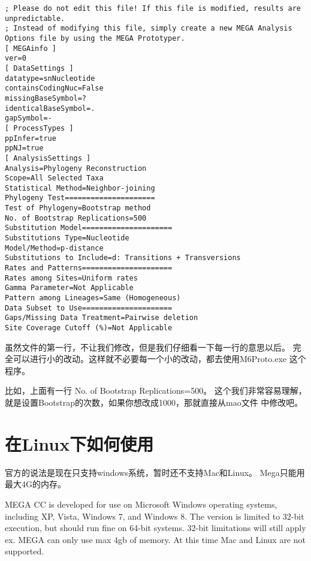 \documentclass{ctexart}
\begin{document}
\begin{lstlisting}
; Please do not edit this file! If this file is modified, results are unpredictable.
; Instead of modifying this file, simply create a new MEGA Analysis Options file by using the MEGA Prototyper.
[ MEGAinfo ]
ver=0
[ DataSettings ]
datatype=snNucleotide
containsCodingNuc=False
missingBaseSymbol=?
identicalBaseSymbol=.
gapSymbol=-
[ ProcessTypes ]
ppInfer=true
ppNJ=true
[ AnalysisSettings ]
Analysis=Phylogeny Reconstruction
Scope=All Selected Taxa
Statistical Method=Neighbor-joining
Phylogeny Test=====================
Test of Phylogeny=Bootstrap method
No. of Bootstrap Replications=500
Substitution Model=====================
Substitutions Type=Nucleotide
Model/Method=p-distance
Substitutions to Include=d: Transitions + Transversions
Rates and Patterns=====================
Rates among Sites=Uniform rates
Gamma Parameter=Not Applicable
Pattern among Lineages=Same (Homogeneous)
Data Subset to Use=====================
Gaps/Missing Data Treatment=Pairwise deletion
Site Coverage Cutoff (%)=Not Applicable
\end{lstlisting}
虽然文件的第一行，不让我们修改，但是我们仔细看一下每一行的意思以后。
完全可以进行小的改动。这样就不必要每一个小的改动，都去使用M6Proto.exe
这个程序。

比如，上面有一行 No. of Bootstrap Replications=500。
这个我们非常容易理解，就是设置Bootstrap的次数，如果你想改成1000，那就直接从mao文件
中修改吧。
\section{在Linux下如何使用}
\label{sec-5}

官方的说法是现在只支持windows系统，暂时还不支持Mac和Linux。
Mega只能用最大4G的内存。

MEGA CC is developed for use on Microsoft Windows operating systems, 
including XP, Vista, Windows 7, and Windows 8. 
The version is limited to 32-bit execution, but should run fine on 64-bit systems.
32-bit limitations will still apply ex. 
MEGA can only use max 4gb of memory. 
At this time Mac and Linux are not supported.
\end{document}
